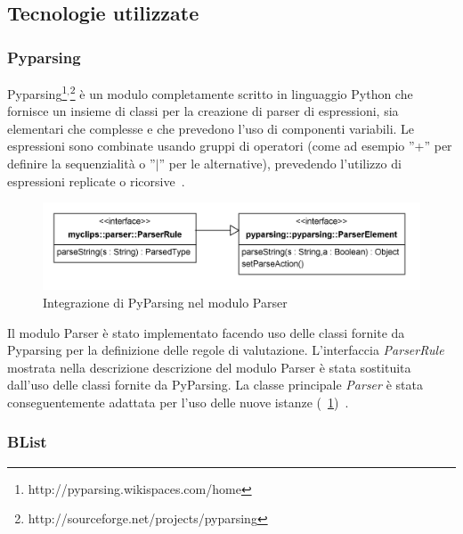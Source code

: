 \subsection{Tecnologie utilizzate}

\subsubsection{Pyparsing}
Pyparsing\footnote{http://pyparsing.wikispaces.com/home}$^,$\footnote{http://sourceforge.net/projects/pyparsing} è un modulo completamente scritto in linguaggio Python che fornisce un insieme di classi per la creazione di parser di espressioni, sia elementari che complesse e che prevedono l'uso di componenti variabili. Le espressioni sono combinate usando gruppi di operatori (come ad esempio ''+'' per definire la sequenzialità o ''$\mid$'' per le alternative), prevedendo l'utilizzo di espressioni replicate o ricorsive~\cite{pyparsing-gs}.

\begin{figure}[h]
\centering
\includegraphics[width=1\textwidth]{Immagini/Capitolo3/Classi/myclips_parser_PyParsing.png}
\caption[Integrazione di PyParsing nel modulo Parser]{Integrazione di PyParsing nel modulo Parser}\label{fig:class-myclips-parser-pyparsing}
\end{figure}

Il modulo Parser è stato implementato facendo uso delle classi fornite da Pyparsing per la definizione delle regole di valutazione. L'interfaccia \emph{ParserRule} mostrata nella descrizione descrizione del modulo Parser è stata sostituita dall'uso delle classi fornite da PyParsing. La classe principale \emph{Parser} è stata conseguentemente adattata per l'uso delle nuove istanze (\figurename~\ref{fig:class-myclips-parser-pyparsing})~\cite{pyparsing-apidoc}.

\subsubsection{BList}

